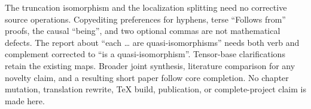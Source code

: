 The truncation isomorphism and the localization splitting need no corrective source operations. Copyediting preferences for hyphens, terse ``Follows from'' proofs, the causal ``being'', and two optional commas are not mathematical defects. The report about ``each \ldots{} are quasi-isomorphisms'' needs both verb and complement corrected to ``is a quasi-isomorphism''. Tensor-base clarifications retain the existing maps. Broader joint synthesis, literature comparison for any novelty claim, and a resulting short paper follow core completion. No chapter mutation, translation rewrite, TeX build, publication, or complete-project claim is made here.
